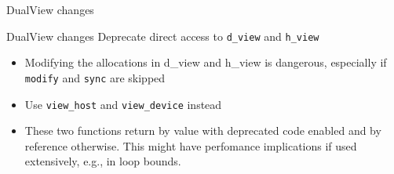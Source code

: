 
\begin{frame}[fragile]\label{sec:dualview}

  {\Huge DualView changes}

  \vspace{10pt}

\end{frame}





\begin{frame}[fragile]{DualView changes}
  Deprecate direct access to \texttt{d\_view} and \texttt{h\_view}
  \begin{itemize}
    \item Modifying the allocations in d\_view and h\_view is dangerous, especially if \texttt{modify} and \texttt{sync} are skipped
    \item Use \texttt{view\_host} and \texttt{view\_device} instead
    \item These two functions return by value with deprecated code enabled and by reference otherwise. This might have perfomance implications if used extensively, e.g., in loop bounds.
  \end{itemize}
\end{frame}



